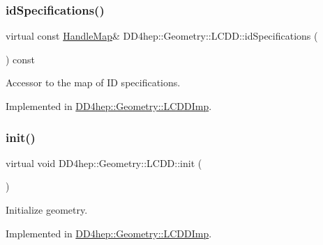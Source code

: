 \hypertarget{class_d_d4hep_1_1_geometry_1_1_l_c_d_d_a16ddadf18c24ad54b816354107338a80}{}\label{class_d_d4hep_1_1_geometry_1_1_l_c_d_d_a16ddadf18c24ad54b816354107338a80} 
\subsubsection{\texorpdfstring{id\+Specifications()}{idSpecifications()}}
{\footnotesize\ttfamily virtual const \hyperlink{class_d_d4hep_1_1_geometry_1_1_l_c_d_d_a05cb11e7355772c7b0794bcca59bf477}{Handle\+Map}\& D\+D4hep\+::\+Geometry\+::\+L\+C\+D\+D\+::id\+Specifications (\begin{DoxyParamCaption}{ }\end{DoxyParamCaption}) const\hspace{0.3cm}{\ttfamily [pure virtual]}}



Accessor to the map of ID specifications. 



Implemented in \hyperlink{class_d_d4hep_1_1_geometry_1_1_l_c_d_d_imp_ad552353b7983f13061f5373182893d16}{D\+D4hep\+::\+Geometry\+::\+L\+C\+D\+D\+Imp}.

\hypertarget{class_d_d4hep_1_1_geometry_1_1_l_c_d_d_a9a4f55004e7375b2b20fb64e1a7ee8de}{}\label{class_d_d4hep_1_1_geometry_1_1_l_c_d_d_a9a4f55004e7375b2b20fb64e1a7ee8de} 
\subsubsection{\texorpdfstring{init()}{init()}}
{\footnotesize\ttfamily virtual void D\+D4hep\+::\+Geometry\+::\+L\+C\+D\+D\+::init (\begin{DoxyParamCaption}{ }\end{DoxyParamCaption})\hspace{0.3cm}{\ttfamily [pure virtual]}}



Initialize geometry. 



Implemented in \hyperlink{class_d_d4hep_1_1_geometry_1_1_l_c_d_d_imp_af0cf7ab83180ee15085bcc7e1383f561}{D\+D4hep\+::\+Geometry\+::\+L\+C\+D\+D\+Imp}.

